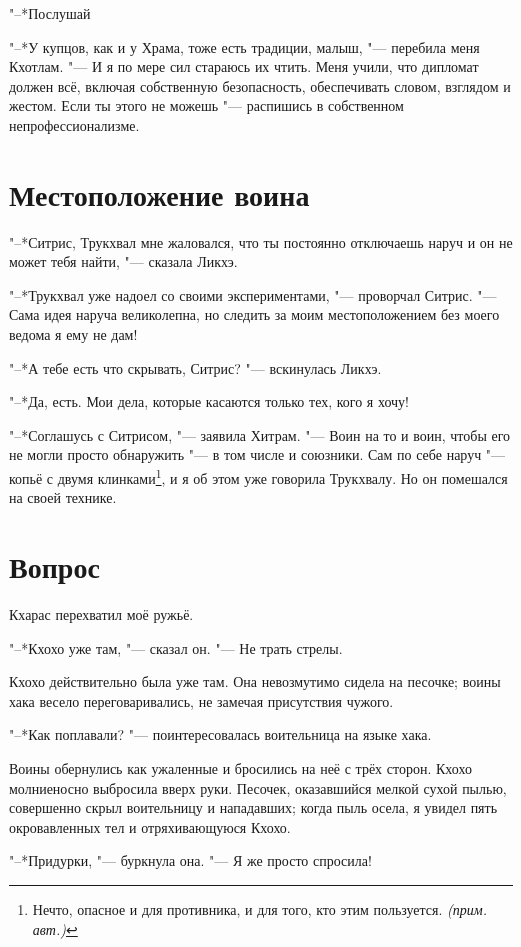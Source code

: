\documentclass[a4paper,10pt,fleqn]{book}
\newcommand{\ldotst}{\so{...}\xspace}
\newcommand{\authornote}{\textit{(прим. авт.)}}
\begin{document}
"--*Послушай\ldotst

"--*У купцов, как и у Храма, тоже есть традиции, малыш, "--- перебила меня Кхотлам.
"--- И я по мере сил стараюсь их чтить.
Меня учили, что дипломат должен всё, включая собственную безопасность, обеспечивать словом, взглядом и жестом.
Если ты этого не можешь "--- распишись в собственном непрофессионализме.

\section{Местоположение воина}

"--*Ситрис, Трукхвал мне жаловался, что ты постоянно отключаешь наруч и он не может тебя найти, "--- сказала Ликхэ.

"--*Трукхвал уже надоел со своими экспериментами, "--- проворчал Ситрис.
"--- Сама идея наруча великолепна, но следить за моим местоположением без моего ведома я ему не дам!

"--*А тебе есть что скрывать, Ситрис? "--- вскинулась Ликхэ.

"--*Да, есть.
Мои дела, которые касаются только тех, кого я хочу!

"--*Соглашусь с Ситрисом, "--- заявила Хитрам.
"--- Воин на то и воин, чтобы его не могли просто обнаружить "--- в том числе и союзники.
Сам по себе наруч "--- копьё с двумя клинками\footnote
{Нечто, опасное и для противника, и для того, кто этим пользуется. \authornote},
и я об этом уже говорила Трукхвалу.
Но он помешался на своей технике.

\section{Вопрос}

Кхарас перехватил моё ружьё.

"--*Кхохо уже там, "--- сказал он.
"--- Не трать стрелы.

Кхохо действительно была уже там.
Она невозмутимо сидела на песочке;
воины хака весело переговаривались, не замечая присутствия чужого.

"--*Как поплавали? "--- поинтересовалась воительница на языке хака.

Воины обернулись как ужаленные и бросились на неё с трёх сторон.
Кхохо молниеносно выбросила вверх руки.
Песочек, оказавшийся мелкой сухой пылью, совершенно скрыл воительницу и нападавших;
когда пыль осела, я увидел пять окровавленных тел и отряхивающуюся Кхохо.

"--*Придурки, "--- буркнула она.
"--- Я же просто спросила!
\end{document}
